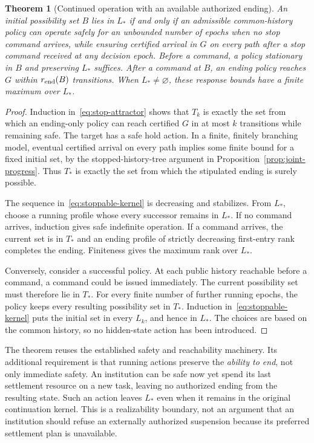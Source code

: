 \documentclass[11pt,letterpaper]{article}
\theoremstyle{plain}
\newtheorem{theorem}[proposition]{Theorem}
\theoremstyle{definition}
\theoremstyle{remark}
\begin{document}
\begin{theorem}[Continued operation with an available authorized ending]\label{thm:stoppable-operation}
An initial possibility set $B$ lies in $L_*$ if and only if an admissible common-history policy can operate safely for an unbounded number of epochs when no stop command arrives, while ensuring certified arrival in $G$ on every path after a stop command received at any decision epoch. Before a command, a policy stationary in $B$ and preserving $L_*$ suffices. After a command at $B$, an ending policy reaches $G$ within $r_{\rm end}(B)$ transitions. When $L_*\ne\varnothing$, these response bounds have a finite maximum over $L_*$.
\end{theorem}
\begin{proof}
Induction in~\eqref{eq:stop-attractor} shows that $T_k$ is exactly the set from which an ending-only policy can reach certified $G$ in at most $k$ transitions while remaining safe. The target has a safe hold action. In a finite, finitely branching model, eventual certified arrival on every path implies some finite bound for a fixed initial set, by the stopped-history-tree argument in Proposition~\ref{prop:joint-progress}. Thus $T_*$ is exactly the set from which the stipulated ending is surely possible.

The sequence in~\eqref{eq:stoppable-kernel} is decreasing and stabilizes. From $L_*$, choose a running profile whose every successor remains in $L_*$. If no command arrives, induction gives safe indefinite operation. If a command arrives, the current set is in $T_*$ and an ending profile of strictly decreasing first-entry rank completes the ending. Finiteness gives the maximum rank over $L_*$.

Conversely, consider a successful policy. At each public history reachable before a command, a command could be issued immediately. The current possibility set must therefore lie in $T_*$. For every finite number of further running epochs, the policy keeps every resulting possibility set in $T_*$. Induction in~\eqref{eq:stoppable-kernel} puts the initial set in every $L_k$, and hence in $L_*$. The choices are based on the common history, so no hidden-state action has been introduced.
\end{proof}

The theorem reuses the established safety and reachability machinery. Its additional requirement is that running actions preserve the \emph{ability to end}, not only immediate safety. An institution can be safe now yet spend its last settlement resource on a new task, leaving no authorized ending from the resulting state. Such an action leaves $L_*$ even when it remains in the original continuation kernel. This is a realizability boundary, not an argument that an institution should refuse an externally authorized suspension because its preferred settlement plan is unavailable.
\end{document}
